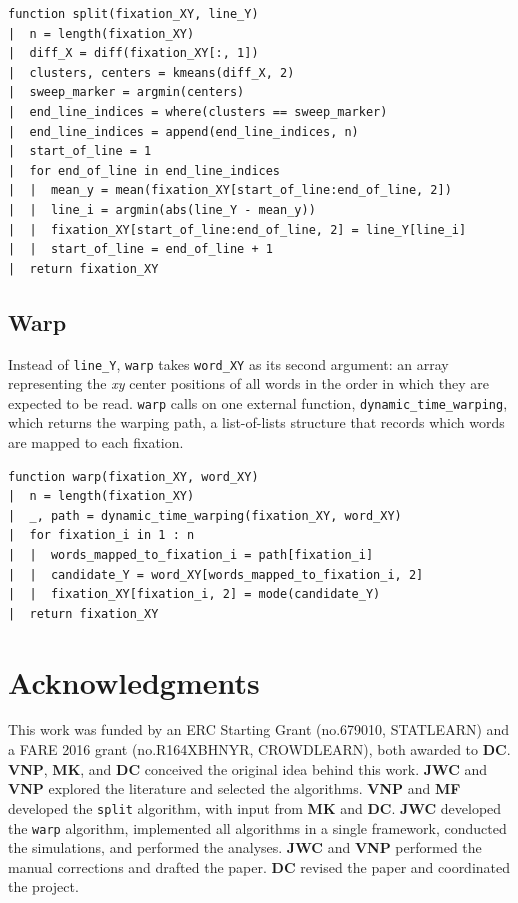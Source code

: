 \documentclass[doc,biblatex]{apa7}
\begin{document}
\begin{verbatim}
function split(fixation_XY, line_Y)
|  n = length(fixation_XY)
|  diff_X = diff(fixation_XY[:, 1])
|  clusters, centers = kmeans(diff_X, 2)
|  sweep_marker = argmin(centers)
|  end_line_indices = where(clusters == sweep_marker)
|  end_line_indices = append(end_line_indices, n)
|  start_of_line = 1
|  for end_of_line in end_line_indices
|  |  mean_y = mean(fixation_XY[start_of_line:end_of_line, 2])
|  |  line_i = argmin(abs(line_Y - mean_y))
|  |  fixation_XY[start_of_line:end_of_line, 2] = line_Y[line_i]
|  |  start_of_line = end_of_line + 1
|  return fixation_XY
\end{verbatim}

\subsection{Warp}

Instead of \texttt{line\_Y}, \texttt{warp} takes \texttt{word\_XY} as its second argument: an array representing the \textit{xy} center positions of all words in the order in which they are expected to be read. \texttt{warp} calls on one external function, \texttt{dynamic\_time\_warping}, which returns the warping path, a list-of-lists structure that records which words are mapped to each fixation.

\begin{verbatim}
function warp(fixation_XY, word_XY)
|  n = length(fixation_XY)
|  _, path = dynamic_time_warping(fixation_XY, word_XY)
|  for fixation_i in 1 : n
|  |  words_mapped_to_fixation_i = path[fixation_i]
|  |  candidate_Y = word_XY[words_mapped_to_fixation_i, 2]
|  |  fixation_XY[fixation_i, 2] = mode(candidate_Y)
|  return fixation_XY
\end{verbatim}


\section{Acknowledgments}

This work was funded by an ERC Starting Grant (no.\@ 679010, STATLEARN) and a FARE 2016 grant (no.\@ R164XBHNYR, CROWDLEARN), both awarded to \textbf{DC}. \textbf{VNP}, \textbf{MK}, and \textbf{DC} conceived the original idea behind this work. \textbf{JWC} and \textbf{VNP} explored the literature and selected the algorithms. \textbf{VNP} and \textbf{MF} developed the \texttt{split} algorithm, with input from \textbf{MK} and \textbf{DC}. \textbf{JWC} developed the \texttt{warp} algorithm, implemented all algorithms in a single framework, conducted the simulations, and performed the analyses. \textbf{JWC} and \textbf{VNP} performed the manual corrections and drafted the paper. \textbf{DC} revised the paper and coordinated the project.
\end{document}
